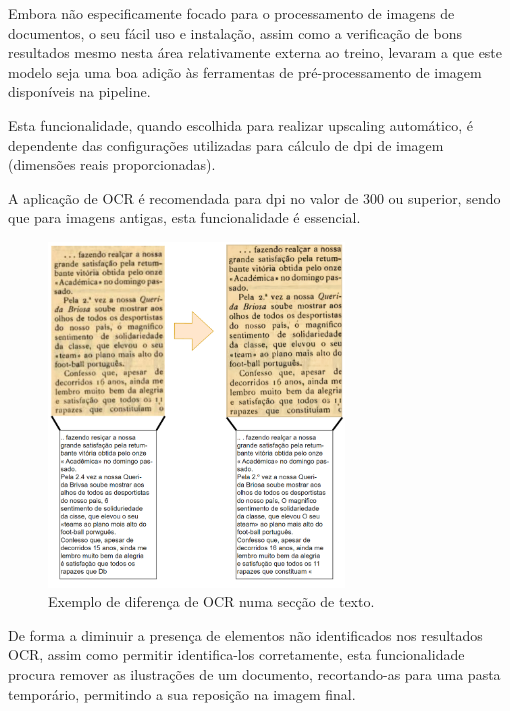 Embora não especificamente focado para o processamento de imagens de documentos, o seu fácil uso e instalação, assim como a verificação de bons resultados mesmo nesta área relativamente externa ao treino, levaram a que este modelo seja uma boa adição às ferramentas de pré-processamento de imagem disponíveis na pipeline.

Esta funcionalidade, quando escolhida para realizar upscaling automático, é dependente das configurações utilizadas para cálculo de dpi de imagem (dimensões reais proporcionadas).

A aplicação de OCR é recomendada para dpi no valor de 300 ou superior, sendo que para imagens antigas, esta funcionalidade é essencial.


\begin{figure}[H]
	\centering
	\includegraphics[width=0.7\textwidth]{images/ilustracoes/upscaling_example.png}
	\caption{Exemplo de diferença de OCR numa secção de texto.}
	\label{fig:upscaling_example}
\end{figure}



De forma a diminuir a presença de elementos não identificados nos resultados OCR, assim como permitir identifica-los corretamente, esta funcionalidade procura remover as ilustrações de um documento, recortando-as para uma pasta temporário, permitindo a sua reposição na imagem final.

